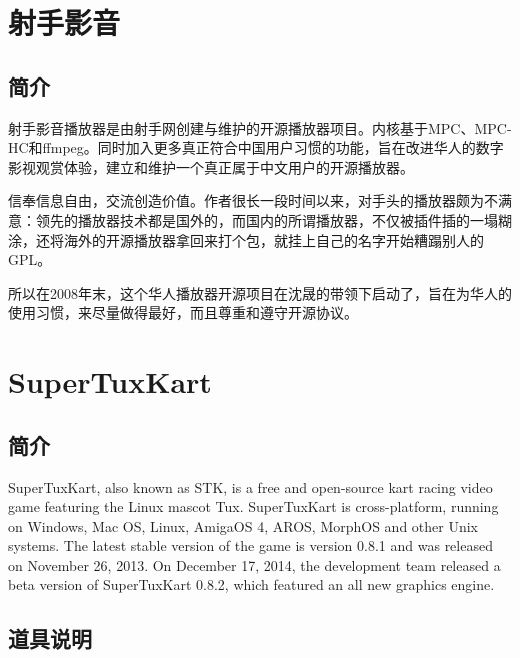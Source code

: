 \documentclass[paper=a4,fontsize=11pt]{article}
\begin{document}
	\section{射手影音}
	
	\subsection{简介}
	射手影音播放器是由射手网创建与维护的开源播放器项目。内核基于MPC、MPC-HC和ffmpeg。同时加入更多真正符合中国用户习惯的功能，旨在改进华人的数字影视观赏体验，建立和维护一个真正属于中文用户的开源播放器。
	
	信奉信息自由，交流创造价值。作者很长一段时间以来，对手头的播放器颇为不满意：领先的播放器技术都是国外的，而国内的所谓播放器，不仅被插件插的一塌糊涂，还将海外的开源播放器拿回来打个包，就挂上自己的名字开始糟蹋别人的GPL。
	
	所以在2008年末，这个华人播放器开源项目在沈晟的带领下启动了，旨在为华人的使用习惯，来尽量做得最好，而且尊重和遵守开源协议。
			
	\section{SuperTuxKart}
	
	\subsection{简介}
	
	SuperTuxKart, also known as STK, is a free and open-source kart racing video game featuring the Linux mascot Tux. SuperTuxKart is cross-platform, running on Windows, Mac OS, Linux, AmigaOS 4, AROS, MorphOS and other Unix systems. The latest stable version of the game is version 0.8.1 and was released on November 26, 2013. On December 17, 2014, the development team released a beta version of SuperTuxKart 0.8.2, which featured an all new graphics engine.
	
	\subsection{道具说明}
	
\end{document}
